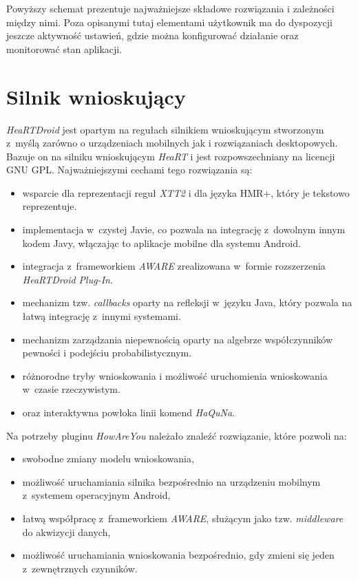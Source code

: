 Powyższy schemat prezentuje najważniejsze składowe rozwiązania i zależności między nimi. Poza opisanymi tutaj elementami użytkownik ma do dyspozycji jeszcze aktywność ustawień, gdzie można konfigurować działanie oraz monitorować stan aplikacji.



\section{Silnik wnioskujący}
\label{sec:silnikWnioskujacy}

\textit{HeaRTDroid} jest opartym na regułach silnikiem wnioskującym stworzonym z~myślą zarówno o urządzeniach mobilnych jak i rozwiązaniach desktopowych. Bazuje on na silniku wnioskującym \textit{HeaRT} i jest rozpowszechniany na licencji GNU GPL. Najważniejszymi cechami tego rozwiązania są\cite{heartdroid}:

\begin{itemize}
	\item wsparcie dla reprezentacji reguł \textit{XTT2} i dla języka HMR+, który je tekstowo reprezentuje.
	
	\item implementacja w~czystej Javie, co pozwala na integrację z~dowolnym innym kodem Javy, włączając to aplikacje mobilne dla systemu Android.
	
	\item integracja z~frameworkiem \textit{AWARE} zrealizowana w~formie rozszerzenia \textit{HeaRTDroid Plug-In}.
	
	\item mechanizm tzw. \textit{callbacks} oparty na refleksji w~języku Java, który pozwala na łatwą integrację z~innymi systemami.
	
	\item mechanizm zarządzania niepewnością oparty na algebrze współczynników pewności i podejściu probabilistycznym.
	
	\item różnorodne tryby wnioskowania i możliwość uruchomienia wnioskowania w~czasie rzeczywistym.
	
	\item oraz interaktywna powłoka linii komend \textit{HaQuNa}\cite{heartdroid}.
\end{itemize}

Na potrzeby pluginu \textit{HowAreYou} należało znaleźć rozwiązanie, które pozwoli na: 
\begin{itemize}
	\item swobodne zmiany modelu wnioskowania,
	
	\item możliwość uruchamiania silnika bezpośrednio na urządzeniu mobilnym z~systemem operacyjnym Android,
	
	\item łatwą współpracę z~frameworkiem \textit{AWARE}, służącym jako tzw. \textit{middleware} do akwizycji danych,
	
	\item możliwość uruchamiania wnioskowania bezpośrednio, gdy zmieni się jeden z~zewnętrznych czynników.
\end{itemize}

